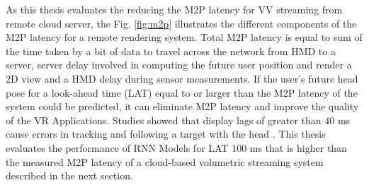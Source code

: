 As this thesis evaluates the reducing the M2P latency for VV streaming from remote cloud server, the Fig. \ref{fig:m2p} illustrates the different components of the M2P latency for a remote rendering system. Total M2P latency is equal to sum of the time taken by a bit of data to travel across the network from HMD to a server, server delay involved in computing the future user position and render a 2D view and a HMD delay during sensor measurements. If the user’s future head pose for a look-ahead time (LAT) equal to or larger than the M2P latency of the system could be predicted, it can eliminate M2P latency and improve the quality of the VR Applications. Studies showed that display lags of greater than 40 ms cause errors in tracking and following a target with the head \cite{delay_sickness}. This thesis evaluates the performance of RNN Models for LAT 100 ms that is higher than the measured M2P latency of a cloud-based volumetric streaming system described in the next section. 

